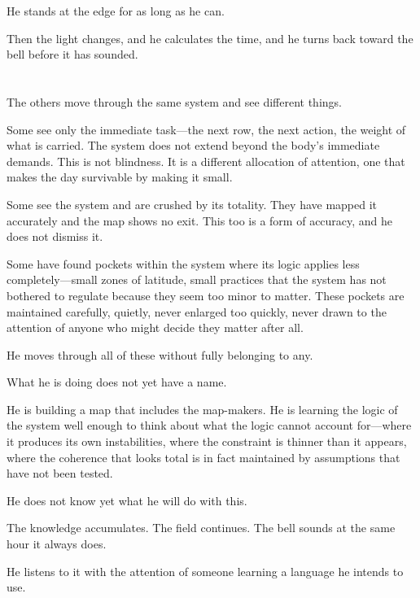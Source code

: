 He stands at the edge for as long as he can.

Then the light changes, and he calculates the time, and he turns
back toward the bell before it has sounded.

\section{}

The others move through the same system and see different things.

Some see only the immediate task---the next row, the next action,
the weight of what is carried. The system does not extend beyond
the body's immediate demands. This is not blindness. It is a
different allocation of attention, one that makes the day
survivable by making it small.

Some see the system and are crushed by its totality. They have
mapped it accurately and the map shows no exit. This too is a
form of accuracy, and he does not dismiss it.

Some have found pockets within the system where its logic applies
less completely---small zones of latitude, small practices that
the system has not bothered to regulate because they seem too
minor to matter. These pockets are maintained carefully, quietly,
never enlarged too quickly, never drawn to the attention of anyone
who might decide they matter after all.

He moves through all of these without fully belonging to any.

What he is doing does not yet have a name.

He is building a map that includes the map-makers. He is learning
the logic of the system well enough to think about what the logic
cannot account for---where it produces its own instabilities,
where the constraint is thinner than it appears, where the
coherence that looks total is in fact maintained by assumptions
that have not been tested.

He does not know yet what he will do with this.

The knowledge accumulates. The field continues. The bell sounds
at the same hour it always does.

He listens to it with the attention of someone learning a language
he intends to use.

